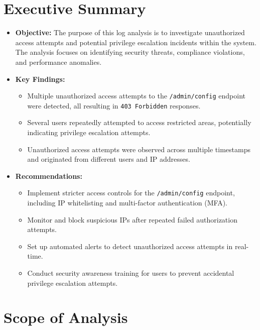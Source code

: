 \documentclass[11pt]{article}
\begin{document}
\tableofcontents
\thispagestyle{empty}
\clearpage

\section{Executive Summary}

\begin{itemize}
    \item \textbf{Objective:}  
    The purpose of this log analysis is to investigate unauthorized access attempts and potential privilege escalation incidents within the system. The analysis focuses on identifying security threats, compliance violations, and performance anomalies.

    \item \textbf{Key Findings:}  
    \begin{itemize}
        \item Multiple unauthorized access attempts to the \texttt{/admin/config} endpoint were detected, all resulting in \texttt{403 Forbidden} responses.
        \item Several users repeatedly attempted to access restricted areas, potentially indicating privilege escalation attempts.
        \item Unauthorized access attempts were observed across multiple timestamps and originated from different users and IP addresses.
    \end{itemize}

    \item \textbf{Recommendations:}  
    \begin{itemize}
        \item Implement stricter access controls for the \texttt{/admin/config} endpoint, including IP whitelisting and multi-factor authentication (MFA).
        \item Monitor and block suspicious IPs after repeated failed authorization attempts.
        \item Set up automated alerts to detect unauthorized access attempts in real-time.
        \item Conduct security awareness training for users to prevent accidental privilege escalation attempts.
    \end{itemize}
\end{itemize}

\section{Scope of Analysis}
\end{document}
